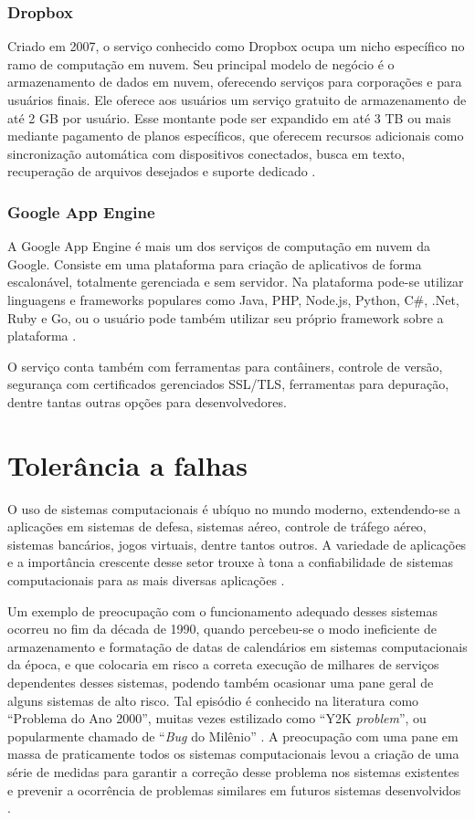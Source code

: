 \documentclass[
	12pt,				%
	a4paper,			%
	english,			%
	french,				%
	spanish,			%
	brazil				%
	]{abntex2}
\begin{document}
\subsubsection{Dropbox}

Criado em 2007, o serviço conhecido como Dropbox \cite{dropbox} ocupa um nicho específico no ramo de computação em nuvem. Seu principal modelo de negócio é o armazenamento de dados em nuvem, oferecendo serviços para corporações e para usuários finais. Ele oferece aos usuários um serviço gratuito de armazenamento de até 2 GB por usuário. Esse montante pode ser expandido em até 3 TB ou mais mediante pagamento de planos específicos, que oferecem recursos adicionais como sincronização automática com dispositivos conectados, busca em texto, recuperação de arquivos desejados e suporte dedicado \cite{dropboxplans}.

\subsubsection{Google App Engine}

A Google App Engine é mais um dos serviços de computação em nuvem da Google. Consiste em uma plataforma para criação de aplicativos de forma escalonável, totalmente gerenciada e sem servidor. Na plataforma pode-se utilizar linguagens e frameworks populares como Java, PHP, Node.js, Python, C\#, .Net, Ruby e Go, ou o usuário pode também utilizar seu próprio framework sobre a plataforma \cite{googleapp}.

O serviço conta também com ferramentas para contâiners, controle de versão, segurança com certificados gerenciados SSL/TLS, ferramentas para depuração, dentre tantas outras opções para desenvolvedores.

\section{Tolerância a falhas}

O uso de sistemas computacionais é ubíquo no mundo moderno, extendendo-se a aplicações em sistemas de defesa, sistemas aéreo, controle de tráfego aéreo, sistemas bancários, jogos virtuais, dentre tantos outros. A variedade de aplicações e a importância crescente desse setor trouxe à tona a confiabilidade de sistemas computacionais para as mais diversas aplicações \cite{andersonfault}.

Um exemplo de preocupação com o funcionamento adequado desses sistemas ocorreu no fim da década de 1990, quando percebeu-se o modo ineficiente de armazenamento e formatação de datas de calendários em sistemas computacionais da época, e que colocaria em risco a correta execução de milhares de serviços dependentes desses sistemas, podendo também ocasionar uma pane geral de alguns sistemas de alto risco. Tal episódio é conhecido na literatura como ``Problema do Ano 2000'', muitas vezes estilizado como ``Y2K \emph{problem}'', ou popularmente chamado de ``\emph{Bug} do Milênio'' . A preocupação com uma pane em massa de praticamente todos os sistemas computacionais levou a criação de uma série de medidas para garantir a correção desse problema nos sistemas existentes e prevenir a ocorrência de problemas similares em futuros sistemas desenvolvidos \cite{petersen1998y2k}.
\end{document}
